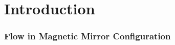 
\section{Introduction}
\begin{frame}
    \frametitle{Flow in Magnetic Mirror Configuration}
    \cite{aikawa_stability_1979}
\end{frame}